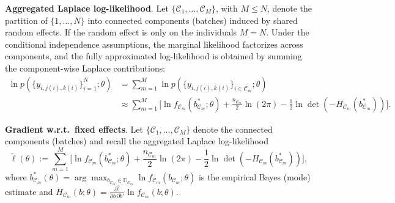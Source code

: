 \documentclass[12pt]{article}
\begin{document}
\textbf{Aggregated Laplace log-likelihood}. 
Let \(\{\mathcal{C}_1,\dots,\mathcal{C}_M\}\), with $M \leq N$, denote the partition of \(\{1,\dots,N\}\) into connected components (batches) induced by shared random effects. If the random effect is only on the individuals $M=N$. Under the conditional independence assumptions, the marginal likelihood factorizes across components, and the fully approximated log-likelihood is obtained by summing the component-wise Laplace contributions:
\begin{equation}
\label{eq:laplace_loglik_full}
\begin{split}
\ln p\!\left(\{y_{i,j(i),k(i)}\}_{i=1}^N;\theta\right)
&=
\sum_{m=1}^M
\ln p\!\left(\{y_{i,j(i),k(i)}\}_{i\in\mathcal{C}_m};\theta\right) \\
&\approx
\sum_{m=1}^M
\Bigg[
\ln f_{\mathcal{C}_m}(b_{\mathcal{C}_m}^*;\theta)
+\frac{n_{\mathcal{C}_m}}{2}\ln(2\pi)
-\frac{1}{2}\ln\det\!\left(-H_{\mathcal{C}_m}(b_{\mathcal{C}_m}^*)\right)
\Bigg].
\end{split}
\end{equation}


\textbf{Gradient w.r.t.\ fixed effects}. 
Let \(\{\mathcal{C}_1,\dots,\mathcal{C}_M\}\) denote the connected components (batches) and recall the aggregated Laplace log-likelihood
\[
\tilde\ell(\theta)
:=
\sum_{m=1}^M
\Bigg[
\ln f_{\mathcal{C}_m}(b_{\mathcal{C}_m}^*;\theta)
+\frac{n_{\mathcal{C}_m}}{2}\ln(2\pi)
-\frac{1}{2}\ln\det\!\left(-H_{\mathcal{C}_m}(b_{\mathcal{C}_m}^*)\right)
\Bigg],
\]
where \(b_{\mathcal{C}_m}^*(\theta)=\arg\max_{b_{\mathcal{C}_m}\in\mathbb{D}_{\mathcal{C}_m}} \ln f_{\mathcal{C}_m}(b_{\mathcal{C}_m};\theta)\) is the empirical Bayes (mode) estimate and
\(H_{\mathcal{C}_m}(b;\theta)=\frac{\partial^2}{\partial b\,\partial b'}\ln f_{\mathcal{C}_m}(b;\theta)\).
\end{document}
